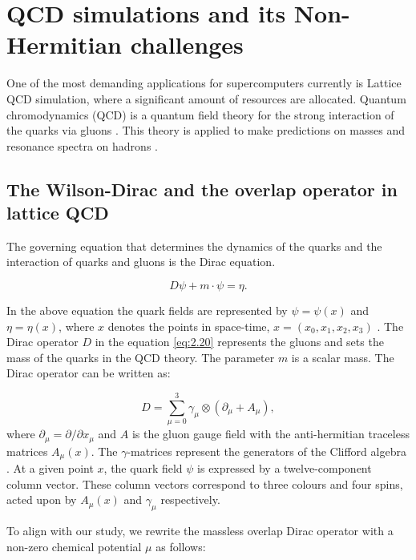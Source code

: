 \chapter{QCD simulations and its Non-Hermitian challenges}
\label{sec:QCD_sim_and_non_herm_challenges}

One of the most demanding applications for supercomputers currently is Lattice QCD simulation, where a significant amount of resources are allocated. Quantum chromodynamics (QCD) is a quantum field theory for the strong interaction of the quarks via gluons \cite{30}. This theory is applied to make predictions on masses and resonance spectra on hadrons \cite{29}.

\section{The Wilson-Dirac and the overlap operator in lattice QCD}
\label{sec:wil_dirac_overlap}

The governing equation that determines the dynamics of the quarks and the interaction of quarks and gluons is the Dirac equation.

\begin{equation}
    D\psi + m \cdot \psi = \eta.
    \label{eq:2.20}
\end{equation}

In the above equation the quark fields are represented by $\psi = \psi(x)$ and $\eta = \eta(x)$, where $x$ denotes the points in space-time,
$x = (x_{0}, x_{1}, x_{2}, x_{3})$ \cite{31}. The Dirac operator $D$ in the equation \eqref{eq:2.20} represents the gluons and sets the mass of the quarks in the QCD theory. The parameter $m$ is a scalar mass. The Dirac operator can be written as:

\begin{equation}
    D = \sum_{\mu=0}^{3} \gamma_{\mu} \otimes (\partial_\mu + A_\mu),
    \label{eq:2.21}
\end{equation}
where $\partial_\mu = \partial / \partial x_{\mu}$ and $A$ is the gluon gauge field with the anti-hermitian traceless matrices $A_{\mu}(x)$. The $\gamma$-matrices represent the generators of the Clifford algebra \cite{32}. At a given point $x$, the quark field $\psi$ is expressed by a twelve-component column vector. These column vectors correspond to three colours and four spins, acted upon by $A_{\mu}(x)$ and $\gamma_{\mu}$ respectively.

To align with our study, we rewrite the massless overlap Dirac operator with a non-zero chemical potential $\mu$ as follows\cite{33}:

